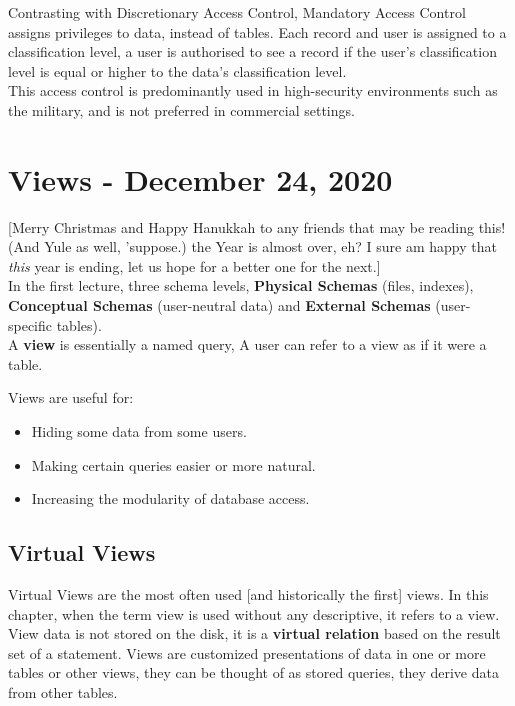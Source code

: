 \documentclass[11pt,a4paper,twocolumn]{book}
\begin{document}
Contrasting with Discretionary Access Control, Mandatory Access Control assigns privileges to data, instead of tables. Each record and user is assigned to a classification level, a user is authorised to see a record if the user's classification level is equal or higher to the data's classification level.\\

This access control is predominantly used in high-security environments such as the military, and is not preferred in commercial settings.

\chapter{Views - December 24, 2020}

[Merry Christmas and Happy Hanukkah to any friends that may be reading this! (And Yule as well, 'suppose.) the Year is almost over, eh? I sure am happy that \textit{this} year is ending, let us hope for a better one for the next.]\\

In the first lecture, three schema levels, \textbf{Physical Schemas} (files, indexes), \textbf{Conceptual Schemas} (user-neutral data) and \textbf{External Schemas} (user-specific tables).\\

A \textbf{view} is essentially a named query, A user can refer to a view as if it were a table.

Views are useful for:

\begin{itemize}
\item Hiding some data from some users.
\item Making certain queries easier or more natural.
\item Increasing the modularity of database access.
\end{itemize}

\section{Virtual Views}

Virtual Views are the most often used [and historically the first] views. In this chapter, when the term view is used without any descriptive, it refers to a view.\\

View data is not stored on the disk, it is a \textbf{virtual relation} based on the result set of a  statement. Views are customized presentations of data in one or more tables or other views, they can be thought of  as stored queries, they derive data from other tables.\\
\end{document}
